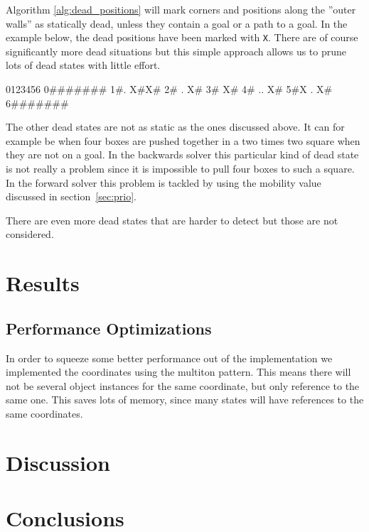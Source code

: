 \documentclass[a4paper,11pt]{article}
\begin{document}
Algorithm \ref{alg:dead_positions} will mark corners and positions along the
''outer walls'' as statically dead, unless they contain a goal or a path to a goal.
In the example below, the dead positions have been marked with \verb!X!.
There are of course significantly more dead situations but this simple approach 
allows us to prune lots of dead states with little effort.

\begin{verbatimtab}
 0123456
0#######
1#. X#X#
2# .  X#
3#    X#
4# .. X#
5#X . X#
6#######

\end{verbatimtab}

The other dead states are not as static as the ones discussed above. 
It can for example be when four boxes are pushed together in a two times two square when they are not on a goal.
In the backwards solver this particular kind of dead state is not really a problem since it is
impossible to pull four boxes to such a square.
In the forward solver this problem is tackled by using the mobility value discussed in section~\ref{sec:prio}. 

There are even more dead states that are harder to detect but those are not considered. 



\section{Results}

\subsection{Performance Optimizations}

In order to squeeze some better performance out of the implementation we implemented
the coordinates using the multiton pattern.
This means there will not be several object instances for the same coordinate,
but only reference to the same one.
This saves lots of memory, since many states will have references to the same coordinates.

\section{Discussion}

\section{Conclusions}
\end{document}
